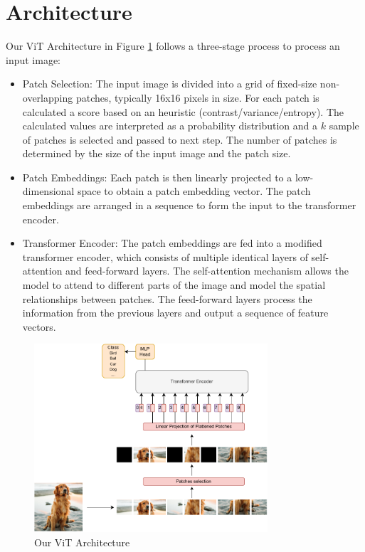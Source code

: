 \section{Architecture}
\label{architecture}
Our ViT Architecture in Figure \ref{fig:ViTArchi} follows a three-stage process to process an input image:
\begin{itemize}
    \item Patch Selection: The input image is divided into a grid of fixed-size non-overlapping patches, typically 16x16 pixels in size. For each patch is calculated a score based on an heuristic (contrast/variance/entropy). The calculated values are interpreted as a probability distribution and a $k$ sample of patches is selected and passed to next step. The number of patches is determined by the size of the input image and the patch size.
    \item Patch Embeddings:  Each patch is then linearly projected to a low-dimensional space to obtain a patch embedding vector. The patch embeddings are arranged in a sequence to form the input to the transformer encoder. 
    \item Transformer Encoder: The patch embeddings are fed into a modified transformer encoder, which consists of multiple identical layers of self-attention and feed-forward layers. The self-attention mechanism allows the model to attend to different parts of the image and model the spatial relationships between patches. The feed-forward layers process the information from the previous layers and output a sequence of feature vectors.
\end{itemize}


    \begin{figure}[htp]
        \centering
        \includegraphics[height=7cm]{images/Vision Transformer Diagram.drawio.pdf}
        \caption{Our ViT Architecture}
        \label{fig:ViTArchi}
    \end{figure}


